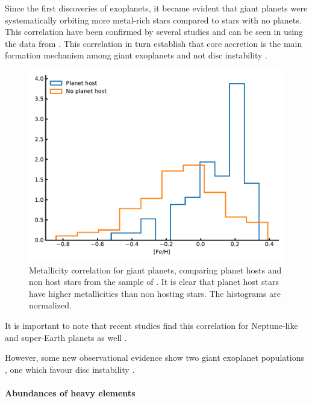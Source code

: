 Since the first discoveries of exoplanets, it became evident that giant planets were systematically
orbiting more metal-rich stars compared to stars with no planets. This correlation have been
confirmed by several studies \citep{Gonzalez1997,Santos2004,Fischer2005,Sousa2008a,Mortier2013b} and
can be seen in  using the data from \citet{Sousa2008a}. This correlation in
turn establish that core accretion is the main formation mechanism among giant exoplanets
\citep{Pollack1996,Ida2004,Mordasini2012} and not disc instability \citep{Boss2002}.

\begin{figure}[htpb!]
    \centering
    \includegraphics[width=1.0\linewidth]{figures/fehCorrelation.pdf}
    \caption{Metallicity correlation for giant planets, comparing planet hosts and non host stars
             from the sample of \citet{Sousa2008a}. It is clear that planet host stars have higher
             metallicities than non hosting stars. The histograms are normalized.}
    \label{fig:fehCorrelation}
\end{figure}

It is important to note that recent studies find this correlation for Neptune-like and
super-Earth planets as well \citep{Wang2015,Zhu2016}.

However, some new observational evidence show two giant exoplanet populations \citep{Santos2017},
one which favour disc instability \citep[see e.g.][]{Nayakshin2017}.

\paragraph{Abundances of heavy elements}

